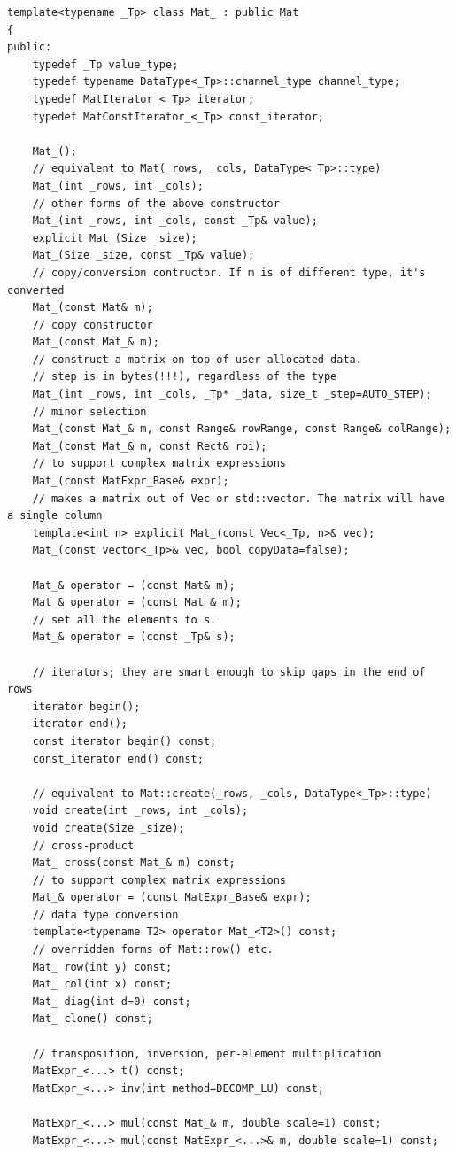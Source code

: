 \begin{lstlisting}
template<typename _Tp> class Mat_ : public Mat
{
public:
    typedef _Tp value_type;
    typedef typename DataType<_Tp>::channel_type channel_type;
    typedef MatIterator_<_Tp> iterator;
    typedef MatConstIterator_<_Tp> const_iterator;

    Mat_();
    // equivalent to Mat(_rows, _cols, DataType<_Tp>::type)
    Mat_(int _rows, int _cols);
    // other forms of the above constructor
    Mat_(int _rows, int _cols, const _Tp& value);
    explicit Mat_(Size _size);
    Mat_(Size _size, const _Tp& value);
    // copy/conversion contructor. If m is of different type, it's converted
    Mat_(const Mat& m);
    // copy constructor
    Mat_(const Mat_& m);
    // construct a matrix on top of user-allocated data.
    // step is in bytes(!!!), regardless of the type
    Mat_(int _rows, int _cols, _Tp* _data, size_t _step=AUTO_STEP);
    // minor selection
    Mat_(const Mat_& m, const Range& rowRange, const Range& colRange);
    Mat_(const Mat_& m, const Rect& roi);
    // to support complex matrix expressions
    Mat_(const MatExpr_Base& expr);
    // makes a matrix out of Vec or std::vector. The matrix will have a single column
    template<int n> explicit Mat_(const Vec<_Tp, n>& vec);
    Mat_(const vector<_Tp>& vec, bool copyData=false);

    Mat_& operator = (const Mat& m);
    Mat_& operator = (const Mat_& m);
    // set all the elements to s.
    Mat_& operator = (const _Tp& s);

    // iterators; they are smart enough to skip gaps in the end of rows
    iterator begin();
    iterator end();
    const_iterator begin() const;
    const_iterator end() const;

    // equivalent to Mat::create(_rows, _cols, DataType<_Tp>::type)
    void create(int _rows, int _cols);
    void create(Size _size);
    // cross-product
    Mat_ cross(const Mat_& m) const;
    // to support complex matrix expressions
    Mat_& operator = (const MatExpr_Base& expr);
    // data type conversion
    template<typename T2> operator Mat_<T2>() const;
    // overridden forms of Mat::row() etc.
    Mat_ row(int y) const;
    Mat_ col(int x) const;
    Mat_ diag(int d=0) const;
    Mat_ clone() const;

    // transposition, inversion, per-element multiplication
    MatExpr_<...> t() const;
    MatExpr_<...> inv(int method=DECOMP_LU) const;

    MatExpr_<...> mul(const Mat_& m, double scale=1) const;
    MatExpr_<...> mul(const MatExpr_<...>& m, double scale=1) const;


\end{lstlisting}
